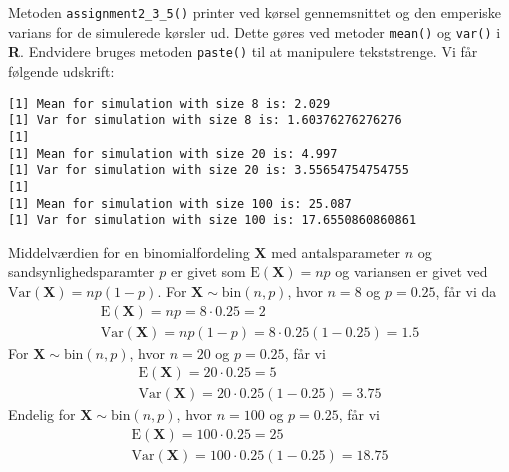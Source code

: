 {

Metoden \texttt{assignment2\_3\_5()} printer ved kørsel gennemsnittet og
den emperiske varians for de simulerede kørsler ud. Dette gøres ved
metoder \texttt{mean()} og \texttt{var()} i \textbf{R}. Endvidere bruges
metoden \texttt{paste()} til at manipulere tekststrenge. Vi får følgende
udskrift:

\begin{verbatim}
[1] Mean for simulation with size 8 is: 2.029
[1] Var for simulation with size 8 is: 1.60376276276276
[1]
[1] Mean for simulation with size 20 is: 4.997
[1] Var for simulation with size 20 is: 3.55654754754755
[1]
[1] Mean for simulation with size 100 is: 25.087
[1] Var for simulation with size 100 is: 17.6550860860861
\end{verbatim}

Middelværdien for en binomialfordeling $\mathbf{X}$ med antalsparameter $n$ og
sandsynlighedsparamter $p$ er givet som $\textrm{E}(\mathbf{X}) = np$ og
variansen er givet ved $\textrm{Var}(\mathbf{X}) = np(1 - p)$. For
$\mathbf{X} \sim{ \textrm{bin} \left( n,p \right) }$, hvor $n = 8$ og $p
= 0.25$,
får vi da
\begin{eqnarray}
    \textrm{E}(\mathbf{X}) = np = 8\cdot0.25 = 2 \\
    \textrm{Var}(\mathbf{X}) = np(1 - p) = 8\cdot0.25(1 - 0.25) = 1.5
\end{eqnarray}
For $\mathbf{X} \sim{ \textrm{bin} \left( n,p \right) }$, hvor $n = 20$
og $p = 0.25$, får vi
\begin{eqnarray}
    \textrm{E}(\mathbf{X}) = 20\cdot0.25 = 5 \\
    \textrm{Var}(\mathbf{X}) = 20\cdot0.25(1 - 0.25) = 3.75
\end{eqnarray}
Endelig for $\mathbf{X} \sim{ \textrm{bin} \left( n,p \right) }$, hvor $n
= 100$ og $p = 0.25$, får vi
\begin{eqnarray}
    \textrm{E}(\mathbf{X}) = 100\cdot 0.25 = 25 \\
    \textrm{Var}(\mathbf{X}) = 100\cdot0.25(1 - 0.25) = 18.75
\end{eqnarray}

}
